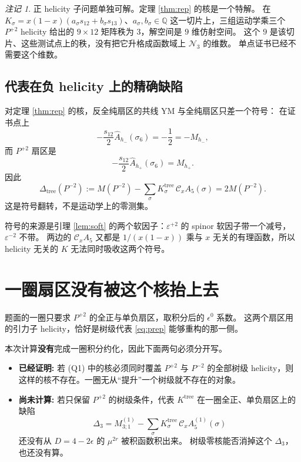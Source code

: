 \documentclass[11pt]{ctexart}
\numberwithin{equation}{section}
\theoremstyle{definition}
\theoremstyle{remark}
\newtheorem{remark}[theorem]{注记}
\newcommand{\cA}{\mathcal C_x}
\newcommand{\cN}{\mathcal N}
\begin{document}
\begin{remark}
正 helicity 子问题单独可解。定理 \ref{thm:rep} 的核是一个特解。
在 $K_\sigma=x(1-x)(a_\sigma s_{12}+b_\sigma s_{13})$、$a_\sigma,b_\sigma\in\mathbb Q$ 这一切片上，三组运动学乘三个 $P^{+2}$ helicity 给出的 $9\times12$ 矩阵秩为 $3$，解空间是 $9$ 维仿射空间。
这个 $9$ 是该切片、这些测试点上的秩，没有把它升格成函数域上 $\cN_3$ 的维数。
单点证书已经不需要这个维数。
\end{remark}

\subsection{代表在负 helicity 上的精确缺陷}
对定理 \ref{thm:rep} 的核，反全纯扇区的共线 YM 与全纯扇区只差一个符号：
在证书点上
\[
-\frac{s_{12}}{2}\widehat A_{h_-}(\sigma_6)=-\frac12=-M_{h_-},
\]
而 $P^{+2}$ 扇区是
\[
-\frac{s_{12}}{2}\widehat A_{h_+}(\sigma_6)=M_{h_+}.
\]
因此
\begin{equation}
\Delta_{\mathrm{tree}}(P^{-2})
:=M(P^{-2})-\sum_\sigma K^{\mathrm{tree}}_\sigma\,\cA A_5(\sigma)
=2M(P^{-2}).
\label{eq:delta}
\end{equation}
这是符号翻转，不是运动学上的零测集。

符号的来源是引理 \ref{lem:soft} 的两个软因子：$\varepsilon^{+2}$ 的 spinor 软因子带一个减号，$\varepsilon^{-2}$ 不带。
两边的 $\cA A_5$ 又都是 $1/(x(1-x))$ 乘与 $x$ 无关的有理函数，所以 helicity 无关的 $K$ 无法同时吸收这两个符号。

\section{一圈扇区没有被这个核抬上去}
题面的一圈只要求 $P^{+2}$ 的全正与单负扇区，取积分后的 $\epsilon^0$ 系数。
这两个扇区用的引力子 helicity，恰好是树级代表 \eqref{eq:prep} 能够重构的那一侧。

本次计算\textbf{没有}完成一圈积分约化，因此下面两句必须分开写。

\begin{itemize}
\item \textbf{已经证明:} 若 (Q1) 中的核必须同时覆盖 $P^{+2}$ 与 $P^{-2}$ 的全部树级 helicity，则这样的核不存在。一圈无从“提升”一个树级就不存在的对象。
\item \textbf{尚未计算:} 若只保留 $P^{+2}$ 的树级条件，代表 $K^{\mathrm{tree}}$ 在一圈全正、单负扇区上的缺陷
\[
\Delta_3
=M^{(1)}_{3;1}
-\sum_{\sigma}K^{\mathrm{tree}}_\sigma\,\cA A^{(1)}_5(\sigma)
\]
还没有从 $D=4-2\epsilon$ 的 $\mu^{2r}$ 被积函数积出来。
树级零核能否消掉这个 $\Delta_3$，也还没有算。
\end{itemize}
\end{document}
